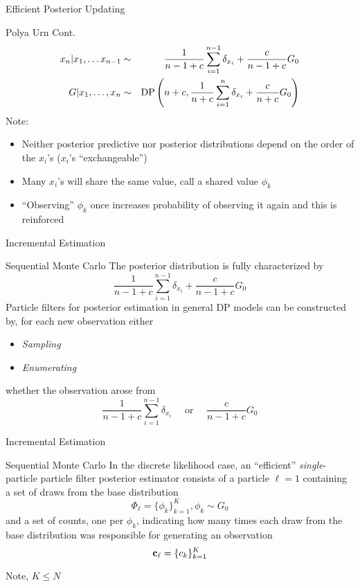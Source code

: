 \begin{frame}[t]{Efficient Posterior Updating}
\begin{block}{Polya Urn \citep{Blackwell1973} Cont.}
\begin{eqnarray*}
x_n | x_1,\ldots x_{n-1} &\sim& \frac{1}{n-1+c}\sum_{i=1}^{n-1}\delta_{x_i} + \frac{c}{n-1+c}G_0 \\
G | x_1, \ldots, x_n &\sim& \DP\left(n+c, \frac{1}{n+c}\sum_{i=1}^n \delta_{x_i} + \frac{c}{n+c}G_0\right)
\end{eqnarray*}
Note: 
\begin{itemize}
\item Neither posterior predictive nor posterior distributions depend on the order of the $x_i$'s ($x_i$'s ``exchangeable'')
\item Many $x_i$'s will share the same value, call a shared value $\phi_k$
\item ``Observing'' $\phi_k$ once increases probability of observing it again and this is reinforced
\end{itemize}
\end{block}
\end{frame}	

\begin{frame}[t]{Incremental Estimation}
\begin{block}{Sequential Monte Carlo}
The posterior distribution is fully characterized by 
\[\frac{1}{n-1+c}\sum_{i=1}^{n-1}\delta_{x_i} + \frac{c}{n-1+c}G_0\]
Particle filters for posterior estimation in general DP models can be constructed by, for each new observation either
\begin{itemize}
\item {\em Sampling}
\item {\em Enumerating} 
\end{itemize}
whether the observation arose from
\[\frac{1}{n-1+c}\sum_{i=1}^{n-1}\delta_{x_i}  \quad \mbox{      or        } \quad \frac{c}{n-1+c}G_0\]
\end{block}
\end{frame}

\begin{frame}[t]{Incremental Estimation}
\begin{block}{Sequential Monte Carlo}
In the discrete likelihood case, an ``efficient''  {\em single}-particle particle filter posterior estimator consists of a particle $\ell = 1$ containing a set of draws from the base distribution 
\[\Phi_\ell = \{\phi_k\}_{k=1}^K, \phi_k \sim G_0\]
and a set of counts, one per $\phi_k$, indicating how many times each draw from the base distribution was responsible for generating an observation
\[{\bf c}_\ell = \{c_k\}_{k=1}^K\]
\end{block}
Note, $K\leq N$
\end{frame}

